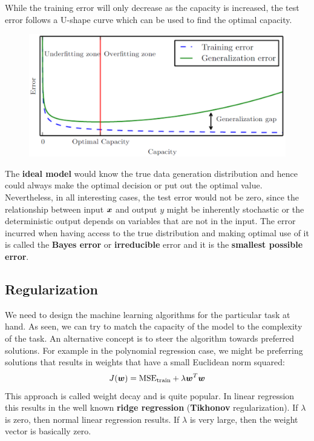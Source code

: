 \begin{multicols}{2}
	While the training error will only decrease as the capacity is increased, the test error follows a U-shape curve which can be used to find the optimal capacity.
	\begin{figure}[H]
		\centering
		\includegraphics[width=0.95\linewidth]{images/gen_curve.PNG}
	\end{figure}
	
	The \textbf{ideal model} would know the true data generation distribution and hence could always make the optimal decision or put out the optimal value. 
	Nevertheless, in all interesting cases, the test error would not be zero, since the relationship between input $\bol{x}$ and output $y$ might be inherently stochastic or the deterministic output depends on variables that are not in the input.
	The error incurred when having access to the true distribution and making optimal use of it is called the \textbf{Bayes error} or \textbf{irreducible} error and it is the \textbf{smallest possible error}.
	
	\subsection{Regularization}
	We need to design the machine learning algorithms for the particular task at hand.
	As seen, we can try to match the capacity of the model to the complexity of the task.
	An alternative concept is to steer the algorithm towards preferred solutions.
	For example in the polynomial regression case, we might be preferring solutions that results in weights that have a small Euclidean norm squared:
	\[ J(\bol{w}) = \text{MSE}_{\text{train}} + \lambda \bol{w}^T\bol{w} \]
	This approach is called weight decay and is quite popular. 
	In linear regression this results in the well known \textbf{ridge regression} (\textbf{Tikhonov} regularization).
	If $\lambda$ is zero, then normal linear regression results.
	If $\lambda$ is very large, then the weight vector is basically zero.\\
	

\end{multicols}
